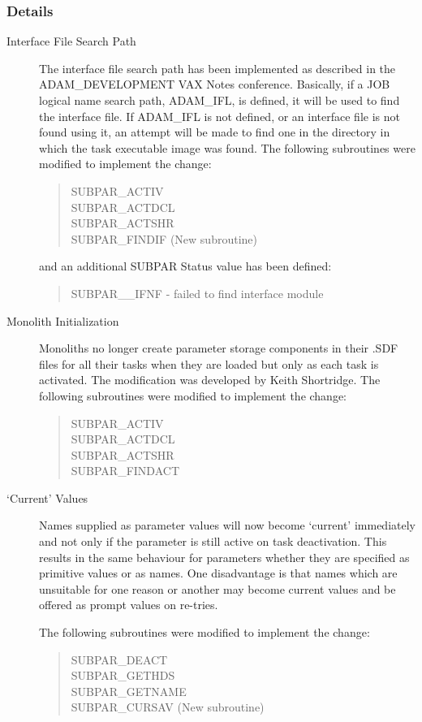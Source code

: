 \subsubsection{Details}
\begin{description}
\item[Interface File Search Path]
The interface file search path has been implemented as described in the
ADAM\_DEVELOPMENT VAX Notes conference.
Basically, if a JOB logical name search path, ADAM\_IFL, is defined, it will be
used to find the interface file.
If ADAM\_IFL is not defined, or an interface file is not found using it, an
attempt will be made to find one in the directory in which the task executable
image was found.
The following subroutines were modified to implement the change:
\begin{quote}
SUBPAR\_ACTIV\\
SUBPAR\_ACTDCL\\
SUBPAR\_ACTSHR\\
SUBPAR\_FINDIF (New subroutine)
\end{quote}
and an additional SUBPAR Status value has been defined:
\begin{quote}
SUBPAR\_\_IFNF - failed to find interface module
\end{quote}
\item[Monolith Initialization]
Monoliths no longer create parameter storage components in their .SDF files
for all their tasks when they are loaded but only as each task is activated.
The modification was developed by Keith Shortridge.
The following subroutines were modified to implement the change:
\begin{quote}
SUBPAR\_ACTIV\\
SUBPAR\_ACTDCL\\
SUBPAR\_ACTSHR\\
SUBPAR\_FINDACT
\end{quote}

\item[`Current' Values]
Names supplied as parameter values will now become `current' immediately and
not only if the parameter is still active on task deactivation.
This results in the same behaviour for parameters whether they are specified
as primitive values or as names.
One disadvantage is that names which are unsuitable for one reason or another
may become current values and be offered as prompt values on re-tries.

The following subroutines were modified to implement the change:
\begin{quote}
SUBPAR\_DEACT\\
SUBPAR\_GETHDS\\
SUBPAR\_GETNAME\\
SUBPAR\_CURSAV (New subroutine)
\end{quote}


\end{description}
